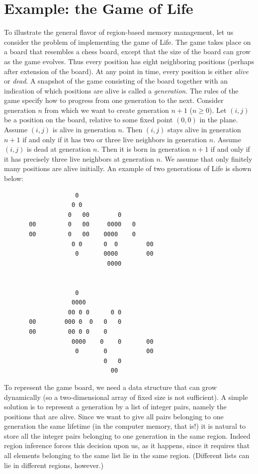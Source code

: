 \documentclass[12pt]{book}
\begin{document}
\section{Example: the Game of Life}
\label{life.sec}
%
To illustrate the general flavor of region-based memory management,
let us consider the problem of implementing the game of Life. The game
takes place on a board that resembles a chess board, except that the
size of the board can grow as the game evolves. Thus every position
has eight neighboring positions (perhaps after extension of the
board).  At any point in time, every position is either {\em alive} or
{\em dead}. A snapshot of the game consisting of the board together
with an indication of which positions are alive is called a {\em
  generation}. The rules of the game specify how to progress from one
generation to the next. Consider generation $n$ from which we want to
create generation $n+1$ ($n\geq0$). Let $(i,j)$ be a position on the
board, relative to some fixed point $(0,0)$ in the plane. Assume
$(i,j)$ is alive in generation $n$. Then $(i,j)$ stays alive in
generation $n+1$ if and only if it has two or three live neighbors in
generation $n$. Assume $(i,j)$ is dead at generation $n$. Then it is
born in generation $n+1$ if and only if it has precisely three live
neighbors at generation $n$. We assume that only finitely many
positions are alive initially. An example of two generations of Life
is shown below:
\begin{verbatim}
                    0
                   0 0
                  0   00        0
       00         0   00     0000   0
       00         0   00    0000    0
                   0 0      0  0        00
                    0       0000        00
                             0000


                    0
                   0000
                  00 0 0      0 0
       00        000 0  0   0   0
       00         00 0 0    0
                   0000    0    0       00
                    0       0           00
                            0   0
                              00
\end{verbatim}

To represent the game board, we need a data structure that can grow
dynamically (so a two-dimensional array of fixed size is not
sufficient).  A simple solution is to represent a generation by a list
of integer pairs, namely the positions that are alive. Since we want
to give all pairs belonging to one generation the same lifetime (in
the computer memory, that is!)  it is natural to store all the integer
pairs belonging to one generation in the same region. Indeed region
inference forces this decision upon us, as it happens, since it
requires that all elements belonging to the same list lie in the same
region. (Different lists can lie in different regions, however.)
\end{document}
